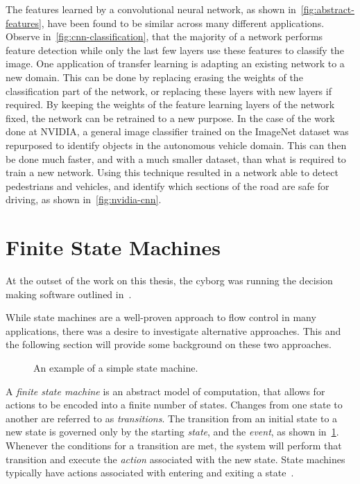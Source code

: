 \documentclass[\rootfolder/main.tex]{subfiles}
\begin{document}
The features learned by a convolutional neural network, as shown in~\cref{fig:abstract-features}, have been found to be similar across many different applications.
Observe in~\cref{fig:cnn-classification}, that the majority of a network performs feature detection while only the last few layers use these features to classify the image.
One application of transfer learning is adapting an existing network to a new domain.
This can be done by replacing erasing the weights of the classification part of the network, or replacing these layers with new layers if required.
By keeping the weights of the feature learning layers of the network fixed, the network can be retrained to a new purpose.
In the case of the work done at NVIDIA, a general image classifier trained on the ImageNet dataset was repurposed to identify objects in the autonomous vehicle domain.
This can then be done much faster, and with a much smaller dataset, than what is required to train a new network.
Using this technique resulted in a network able to detect pedestrians and vehicles, and identify which sections of the road are safe for driving, as shown in~\cref{fig:nvidia-cnn}\cite{NVIDIA}.


\section{Finite State Machines}

At the outset of the work on this thesis, the cyborg was running the decision making software outlined in~\cite{Andersen2017}.

While state machines are a well-proven approach to flow control in many applications, there was a desire to investigate alternative approaches.
This and the following section will provide some background on these two approaches.

\begin{figure}
    \caption{An example of a simple state machine.}
    \label{fig:fsm}
\end{figure}

A \emph{finite state machine} is an abstract model of computation, that allows for actions to be encoded into a finite number of states.
Changes from one state to another are referred to as \emph{transitions}.
The transition from an initial state to a new state is governed only by the starting \emph{state}, and the \emph{event}, as shown in~\cref{fig:fsm}.
Whenever the conditions for a transition are met, the system will perform that transition and execute the \emph{action} associated with the new state.
State machines typically have actions associated with entering and exiting a state~\cite{Millington2009}.
\end{document}
